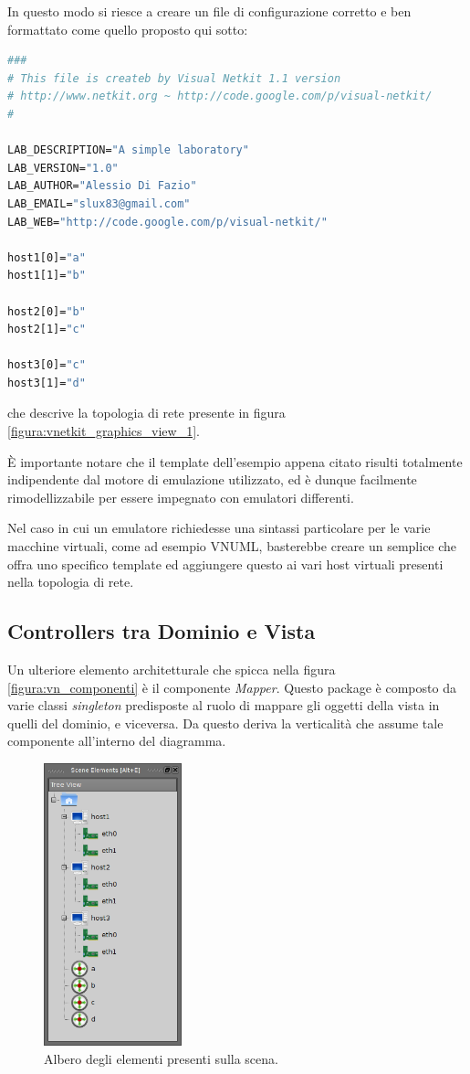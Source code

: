 In questo modo si riesce a creare un file di configurazione corretto e ben formattato come quello proposto qui sotto:
\begin{lstlisting}[language=csh]
###
# This file is createb by Visual Netkit 1.1 version
# http://www.netkit.org ~ http://code.google.com/p/visual-netkit/
#

LAB_DESCRIPTION="A simple laboratory"
LAB_VERSION="1.0"
LAB_AUTHOR="Alessio Di Fazio"
LAB_EMAIL="slux83@gmail.com"
LAB_WEB="http://code.google.com/p/visual-netkit/"

host1[0]="a"
host1[1]="b"

host2[0]="b"
host2[1]="c"

host3[0]="c"
host3[1]="d"
\end{lstlisting}
che descrive la topologia di rete presente in figura \ref{figura:vnetkit_graphics_view_1}.

È importante notare che il template dell'esempio appena citato risulti totalmente indipendente dal motore di emulazione utilizzato, ed è dunque facilmente rimodellizzabile per essere impegnato con emulatori differenti.

Nel caso in cui un emulatore richiedesse una sintassi particolare per le varie macchine virtuali, come ad esempio VNUML, basterebbe creare un semplice \plugin{} che offra uno specifico template ed aggiungere questo \plugin{} ai vari host virtuali presenti nella topologia di rete.

\subsection{Controllers tra Dominio e Vista}
Un ulteriore elemento architetturale che spicca nella figura \ref{figura:vn_componenti} è il componente \emph{Mapper}. Questo package è composto da varie classi \emph{singleton} predisposte al ruolo di mappare gli oggetti della vista in quelli del dominio, e viceversa. Da questo deriva la verticalità che assume tale componente all'interno del diagramma.

\begin{figure}[!htb]
	\centering
	\includegraphics[width=4cm]{images/visualnetkit_tree_elements.png}
	\caption{Albero degli elementi presenti sulla scena.}
	\label{figura:scene_elements}
\end{figure}

